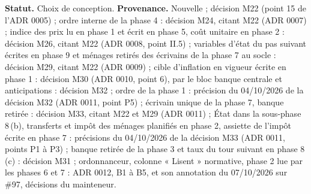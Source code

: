 \documentclass[11pt,a4paper]{article}
\begin{document}
\textbf{Statut.} Choix de conception. \textbf{Provenance.} Nouvelle ; décision M22 (point 15 de l'ADR 0005) ; ordre interne de la phase 4 : décision M24, citant M22 (ADR 0007) ; indice des prix lu en phase 1 et écrit en phase 5, coût unitaire en phase 2 : décision M26, citant M22 (ADR 0008, point II.5) ; variables d'état du pas suivant écrites en phase 9 et ménages retirés des écrivains de la phase 7 au socle : décision M29, citant M22 (ADR 0009) ; cible d'inflation en vigueur écrite en phase 1 : décision M30 (ADR 0010, point 6), par le bloc banque centrale et anticipations : décision M32 ; ordre de la phase 1 : précision du 04/10/2026 de la décision M32 (ADR 0011, point P5) ; écrivain unique de la phase 7, banque retirée : décision M33, citant M22 et M29 (ADR 0011) ; État dans la sous-phase 8\,(b), transferts et impôt des ménages planifiés en phase 2, assiette de l'impôt écrite en phase 7 : précisions du 04/10/2026 de la décision M33 (ADR 0011, points P1 à P3) ; banque retirée de la phase 3 et taux du tour suivant en phase 8\,(c) : décision M31 ; ordonnanceur, colonne « Lisent » normative, phase 2 lue par les phases 6 et 7 : ADR 0012, B1 à B5, et son annotation du 07/10/2026 sur \#97, décisions du mainteneur.
\end{document}
